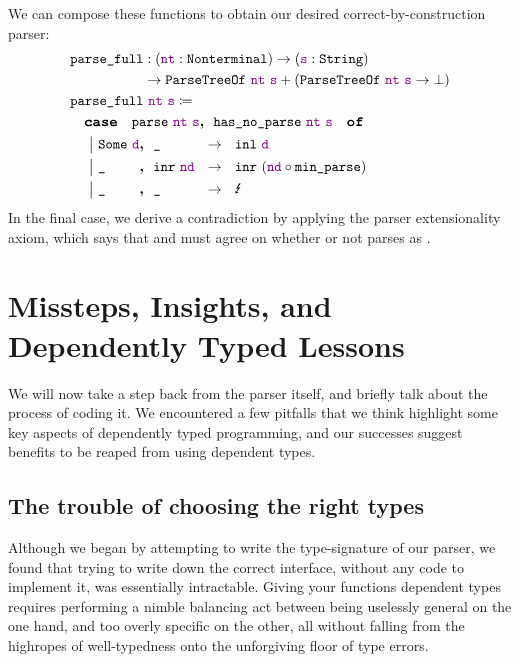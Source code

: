     We can compose these functions to obtain our desired correct-by-construction parser:
    \begin{align*}
      & \fname{parse\_full} \oftypesep (\oftype{\farg{nt}}{\Nonterminal}) \typeto (\oftype{\farg{s}}{\String}) \\
      & \phantom{\fname{parse\_full} }\typeto \typesum{\indname{ParseTreeOf}~\farg{nt}~\farg{s}}{\left(\indname{ParseTreeOf}~\farg{nt}~\farg{s}\typeto\False\right)} \\
      & \fname{parse\_full}~\farg{nt}~\farg{s} \defeq \\
      & \quad \caseof{\fname{parse}~\farg{nt}~\farg{s}\textbf{,}~~\fname{has\_no\_parse}~\farg{nt}~\farg{s}} \\
      & \quad \acase{\Some{\farg{d}}\textbf{,}~~\aswidthof{\hole}{\inr{\farg{nd}}}}{\inl{\farg{d}}} \\
      & \quad \acase{\aswidthof{\hole}{\Some{\farg{d}}}\textbf{,}~~\inr{\farg{nd}}}{\inrp{\farg{nd}\circ\fname{min\_parse}}} \\
      & \quad \acase{\aswidthof{\hole}{\Some{\farg{d}}}\textbf{,}~~\aswidthof{\hole}{\inr{\farg{nd}}}}{\text{\Lightning{}}}
    \end{align*}
    In the final case, we derive a contradiction by applying the parser extensionality axiom, which says that  and  must agree on whether or not  parses as .
    
\section{Missteps, Insights, and Dependently Typed Lessons} \label{sec:lessons}
  We will now take a step back from the parser itself, and briefly talk about the process of coding it.  We encountered a few pitfalls that we think highlight some key aspects of dependently typed programming, and our successes suggest benefits to be reaped from using dependent types.

  \subsection{The trouble of choosing the right types}
    Although we began by attempting to write the type-signature of our parser, we found that trying to write down the correct interface, without any code to implement it, was essentially intractable.  Giving your functions dependent types requires performing a nimble balancing act between being uselessly general on the one hand, and too overly specific on the other, all without falling from the highropes of well-typedness onto the unforgiving floor of type errors.

